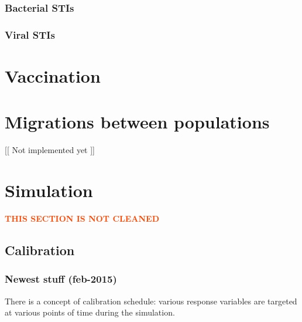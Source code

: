 \documentclass[11pt, onecolumn]{article}
\newcommand{\warning}[1]{\textbf{\textcolor{OrangeRed}{#1}}}
\begin{document}
\subsubsection{Bacterial STIs}
\subsubsection{Viral STIs}




\section{Vaccination}







\section{Migrations between populations}
[[ Not implemented yet ]]



\section{Simulation}

\warning{THIS SECTION IS NOT CLEANED}

\subsection{Calibration}

\subsubsection{Newest stuff (feb-2015)}

There is a concept of calibration schedule: various response variables are targeted at various points of time during the simulation.
\end{document}
